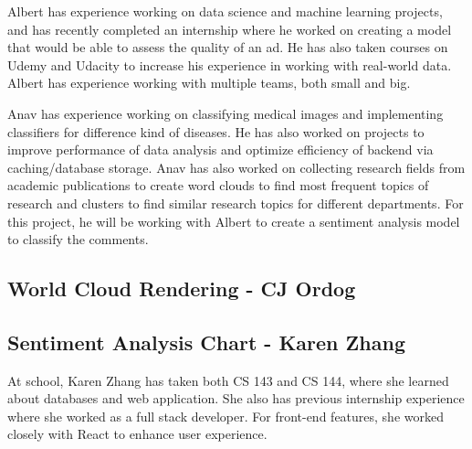 \documentclass[11pt]{article}
\begin{document}
\tab Albert has experience working on data science and machine learning projects, and has recently completed an internship where he worked on creating a model that would be able to assess the quality of an ad. He has also taken courses on Udemy and Udacity to increase his experience in working with real-world data. Albert has experience working with multiple teams, both small and big.
	\par Anav has experience working on classifying medical images and implementing classifiers for difference kind of diseases. He has also worked on projects to improve performance of data analysis and optimize efficiency of backend via caching/database storage. Anav has also worked on collecting research fields from academic publications to create word clouds to find most frequent topics of research and clusters to find similar research topics for different departments. For this project, he will be working with Albert to create a sentiment analysis model to classify the comments.

\subsection{World Cloud Rendering - CJ Ordog}

\subsection{Sentiment Analysis Chart - Karen Zhang}
\tab At school, Karen Zhang has taken both CS 143 and CS 144, where she learned about databases and web application. She also has previous internship experience where she worked as a full stack developer. For front-end features, she worked closely with React to enhance user experience.
\end{document}
